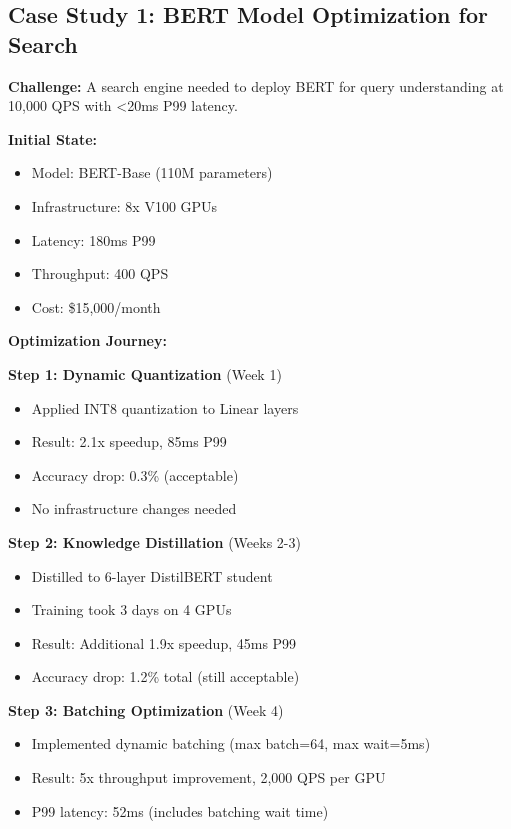 \subsection{Case Study 1: BERT Model Optimization for Search}

\textbf{Challenge:} A search engine needed to deploy BERT for query understanding at 10,000 QPS with <20ms P99 latency.

\textbf{Initial State:}
\begin{itemize}
    \item Model: BERT-Base (110M parameters)
    \item Infrastructure: 8x V100 GPUs
    \item Latency: 180ms P99
    \item Throughput: 400 QPS
    \item Cost: \$15,000/month
\end{itemize}

\textbf{Optimization Journey:}

\textbf{Step 1: Dynamic Quantization} (Week 1)
\begin{itemize}
    \item Applied INT8 quantization to Linear layers
    \item Result: 2.1x speedup, 85ms P99
    \item Accuracy drop: 0.3\% (acceptable)
    \item No infrastructure changes needed
\end{itemize}

\textbf{Step 2: Knowledge Distillation} (Weeks 2-3)
\begin{itemize}
    \item Distilled to 6-layer DistilBERT student
    \item Training took 3 days on 4 GPUs
    \item Result: Additional 1.9x speedup, 45ms P99
    \item Accuracy drop: 1.2\% total (still acceptable)
\end{itemize}

\textbf{Step 3: Batching Optimization} (Week 4)
\begin{itemize}
    \item Implemented dynamic batching (max batch=64, max wait=5ms)
    \item Result: 5x throughput improvement, 2,000 QPS per GPU
    \item P99 latency: 52ms (includes batching wait time)
\end{itemize}

